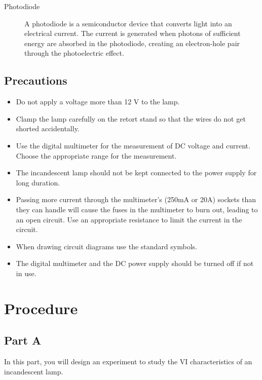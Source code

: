 \begin{description}
\item[Photodiode]

A photodiode is a semiconductor device that converts light into an electrical current. The current is generated when photons of sufficient energy are absorbed in the photodiode, creating an electron-hole pair through the photoelectric effect.

\end{description}


\subsection*{Precautions}

\begin{itemize}
\item Do not apply a voltage more than 12 V to the lamp.
\item Clamp the lamp carefully on the retort stand so that the wires do not get shorted accidentally.
\item Use the digital multimeter for the measurement of DC voltage and current.  Choose the appropriate range for the measurement.
\item The incandescent lamp should not be kept connected to the power supply for long duration.
\item Passing more current through the multimeter's (250mA or 20A) sockets than they can handle will cause the fuses in the multimeter to burn out, leading to an open circuit. Use an appropriate resistance to limit the current in the circuit.
\item When drawing circuit diagrams use the standard symbols.
\item The digital multimeter and the DC power supply should be turned off if not in use.
\end{itemize}


\section*{Procedure}

\subsection*{Part A}

In this part, you will design an experiment to study the VI characteristics of an incandescent lamp. 

